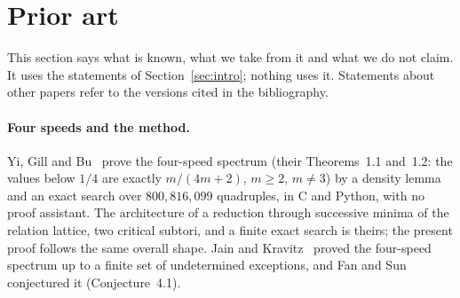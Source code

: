 \documentclass[11pt]{article}
\theoremstyle{remark}
\begin{document}
\section{Prior art}\label{sec:prior}

This section says what is known, what we take from it and what we do not claim. It uses the statements of Section~\ref{sec:intro}; nothing uses it. Statements about other papers refer to the versions cited in the bibliography.

\paragraph{Four speeds and the method.} Yi, Gill and Bu~\cite{YGB} prove the four-speed spectrum (their Theorems~1.1 and~1.2: the values below $1/4$ are exactly $m/(4m+2)$, $m\ge2$, $m\ne3$) by a density lemma and an exact search over $800{,}816{,}099$ quadruples, in C and Python, with no proof assistant. The architecture of a reduction through successive minima of the relation lattice, two critical subtori, and a finite exact search is theirs; the present proof follows the same overall shape. Jain and Kravitz~\cite{JK} proved the four-speed spectrum up to a finite set of undetermined exceptions, and Fan and Sun~\cite{FanSun} conjectured it (Conjecture~4.1).
\end{document}
